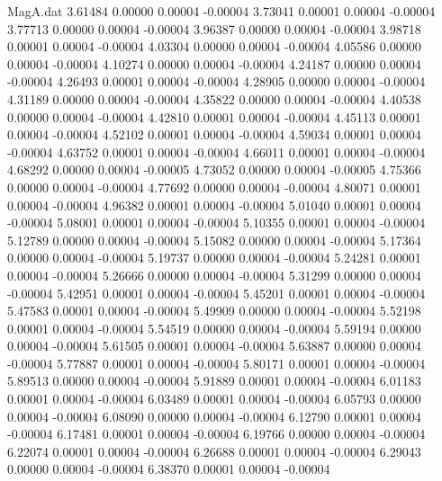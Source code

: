\begin{filecontents}{MagA.dat}
   3.61484    0.00000    0.00004   -0.00004
   3.73041    0.00001    0.00004   -0.00004
   3.77713    0.00000    0.00004   -0.00004
   3.96387    0.00000    0.00004   -0.00004
   3.98718    0.00001    0.00004   -0.00004
   4.03304    0.00000    0.00004   -0.00004
   4.05586    0.00000    0.00004   -0.00004
   4.10274    0.00000    0.00004   -0.00004
   4.24187    0.00000    0.00004   -0.00004
   4.26493    0.00001    0.00004   -0.00004
   4.28905    0.00000    0.00004   -0.00004
   4.31189    0.00000    0.00004   -0.00004
   4.35822    0.00000    0.00004   -0.00004
   4.40538    0.00000    0.00004   -0.00004
   4.42810    0.00001    0.00004   -0.00004
   4.45113    0.00001    0.00004   -0.00004
   4.52102    0.00001    0.00004   -0.00004
   4.59034    0.00001    0.00004   -0.00004
   4.63752    0.00001    0.00004   -0.00004
   4.66011    0.00001    0.00004   -0.00004
   4.68292    0.00000    0.00004   -0.00005
   4.73052    0.00000    0.00004   -0.00005
   4.75366    0.00000    0.00004   -0.00004
   4.77692    0.00000    0.00004   -0.00004
   4.80071    0.00001    0.00004   -0.00004
   4.96382    0.00001    0.00004   -0.00004
   5.01040    0.00001    0.00004   -0.00004
   5.08001    0.00001    0.00004   -0.00004
   5.10355    0.00001    0.00004   -0.00004
   5.12789    0.00000    0.00004   -0.00004
   5.15082    0.00000    0.00004   -0.00004
   5.17364    0.00000    0.00004   -0.00004
   5.19737    0.00000    0.00004   -0.00004
   5.24281    0.00001    0.00004   -0.00004
   5.26666    0.00000    0.00004   -0.00004
   5.31299    0.00000    0.00004   -0.00004
   5.42951    0.00001    0.00004   -0.00004
   5.45201    0.00001    0.00004   -0.00004
   5.47583    0.00001    0.00004   -0.00004
   5.49909    0.00000    0.00004   -0.00004
   5.52198    0.00001    0.00004   -0.00004
   5.54519    0.00000    0.00004   -0.00004
   5.59194    0.00000    0.00004   -0.00004
   5.61505    0.00001    0.00004   -0.00004
   5.63887    0.00000    0.00004   -0.00004
   5.77887    0.00001    0.00004   -0.00004
   5.80171    0.00001    0.00004   -0.00004
   5.89513    0.00000    0.00004   -0.00004
   5.91889    0.00001    0.00004   -0.00004
   6.01183    0.00001    0.00004   -0.00004
   6.03489    0.00001    0.00004   -0.00004
   6.05793    0.00000    0.00004   -0.00004
   6.08090    0.00000    0.00004   -0.00004
   6.12790    0.00001    0.00004   -0.00004
   6.17481    0.00001    0.00004   -0.00004
   6.19766    0.00000    0.00004   -0.00004
   6.22074    0.00001    0.00004   -0.00004
   6.26688    0.00001    0.00004   -0.00004
   6.29043    0.00000    0.00004   -0.00004
   6.38370    0.00001    0.00004   -0.00004

\end{filecontents}
